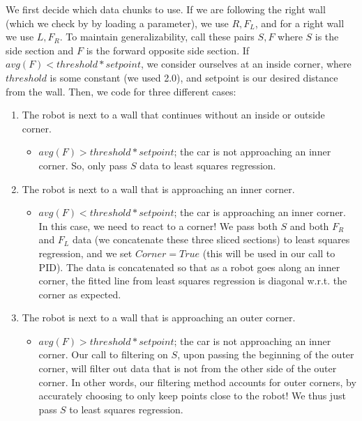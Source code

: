 \documentclass{article}
\begin{document}
We first decide which data chunks to use. If we are following the right wall (which we check by by loading a parameter), we use $R,F_L$, and for a right wall we use $L,F_R$. To maintain generalizability, call these pairs $S,F$ where $S$ is the side section and $F$ is the forward opposite side section. If $avg(F)<threshold*setpoint$, we consider ourselves at an inside corner, where $threshold$ is some constant (we used 2.0), and setpoint is our desired distance from the wall. Then, we code for three different cases:
\begin{enumerate}
    \item The robot is next to a wall that continues without an inside or outside corner. 
    \begin{itemize}
        \item $avg(F)>threshold*setpoint$; the car is not approaching an inner corner. So, only pass $S$ data to least squares regression.
    \end{itemize}
    \item The robot is next to a wall that is approaching an inner corner. 
    \begin{itemize}
        \item $avg(F)<threshold*setpoint$; the car is approaching an inner corner. In this case, we need to react to a corner! We pass both $S$ and both $F_R$ and $F_L$ data (we concatenate these three sliced sections) to least squares regression, and we set $Corner=True$ (this will be used in our call to PID). The data is concatenated so that as a robot goes along an inner corner, the fitted line from least squares regression is diagonal w.r.t. the corner as expected. 
    \end{itemize}
    \item The robot is next to a wall that is approaching an outer corner. 
    \begin{itemize}
        \item $avg(F)>threshold*setpoint$; the car is not approaching an inner corner. Our call to filtering on $S$, upon passing the beginning of the outer corner, will filter out data that is not from the other side of the outer corner. In other words, our filtering method accounts for outer corners, by accurately choosing to only keep points close to the robot! We thus just pass $S$ to least squares regression. 
    \end{itemize}
\end{enumerate}
\end{document}
